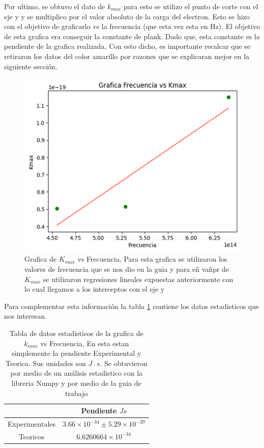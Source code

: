 \documentclass[a4paper, amsfonts, amssymb, amsmath, reprint, showkeys, nofootinbib, twoside]{revtex4-1}
\begin{document}
Por ultimo, se obtuvo el dato de $k_{max}$ para esto se utilizo el punto de corte con el eje y y se multiplico por el valor absoluto de la carga del electron. Esto se hizo con el objetivo de graficarlo vs la frecuencia (que esta vez esta en Hz). El objetivo de esta grafica era conseguir la constante de plank. Dado que, esta constante es la pendiente de la grafica realizada. Con esto dicho, es importante recalcar que se retiraron los datos del color amarillo por razones que se explicaran mejor en la siguiente sección.

\begin{figure}[H]
   \centering
   \includegraphics[scale=0.3]{Grafica_Plank.png}
   \caption{Grafica de $K_{max}$ vs Frecuencia. Para esta grafica se utilizaron los valores de frecuencia que se nos dio en la guia y para eñ vañpr de $K_{max}$ se utilizaron regresiones lineales expuestas anteriormente con lo cual llegamos a los interceptos con el eje y}
   \label{fig:Azul}
\end{figure}

Para complementar esta información la tabla \ref{table:Plank} contiene los datos estadisticos que nos interesan.
\begin{table}
   \centering
   \caption{Tabla de datos estadisticos de la grafica de $k_{max}$ vs Frecuencia, En esta estan simplemente la pendiente Experimental y Teorica. Sus unidades son $J\cdot s$. Se obtuvieron por medio de un análisis estadistico con la libreria Numpy y por medio de la guia de trabajo \cite{Guia}}
   \label{table:Plank}
   \begin{tabular}{|c|c|}
      \hline
      \hline
      &Pendiente $Js$\\
      \hline
      Experimentales&$3.66\times 10^{-34}\pm 5.29\times 10^{-29}$ \\
      Teoricos & $6.6260664\times 10^{-34}$\\
      \hline
      \hline
   \end{tabular}
\end{table}
\end{document}

